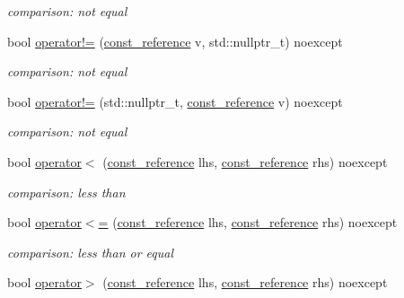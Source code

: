 \begin{DoxyCompactItemize}
\begin{DoxyCompactList}\small\item\em comparison\+: not equal \end{DoxyCompactList}\item 
bool \hyperlink{classnlohmann_1_1basic__json_ae347859ec88176ef76a0cbe5b4514fcf}{operator!=} (\hyperlink{classnlohmann_1_1basic__json_af677a29b0e66edc9f66e5167e4667071}{const\+\_\+reference} v, std\+::nullptr\+\_\+t) noexcept
\begin{DoxyCompactList}\small\item\em comparison\+: not equal \end{DoxyCompactList}\item 
bool \hyperlink{classnlohmann_1_1basic__json_a7f97a91ad8f1d5cf0b9213bd24f247c4}{operator!=} (std\+::nullptr\+\_\+t, \hyperlink{classnlohmann_1_1basic__json_af677a29b0e66edc9f66e5167e4667071}{const\+\_\+reference} v) noexcept
\begin{DoxyCompactList}\small\item\em comparison\+: not equal \end{DoxyCompactList}\item 
bool \hyperlink{classnlohmann_1_1basic__json_aacd442b66140c764c594ac8ad7dfd5b3}{operator$<$} (\hyperlink{classnlohmann_1_1basic__json_af677a29b0e66edc9f66e5167e4667071}{const\+\_\+reference} lhs, \hyperlink{classnlohmann_1_1basic__json_af677a29b0e66edc9f66e5167e4667071}{const\+\_\+reference} rhs) noexcept
\begin{DoxyCompactList}\small\item\em comparison\+: less than \end{DoxyCompactList}\item 
bool \hyperlink{classnlohmann_1_1basic__json_a5c8bb5200f5eac10d31e26be46e5b1ac}{operator$<$=} (\hyperlink{classnlohmann_1_1basic__json_af677a29b0e66edc9f66e5167e4667071}{const\+\_\+reference} lhs, \hyperlink{classnlohmann_1_1basic__json_af677a29b0e66edc9f66e5167e4667071}{const\+\_\+reference} rhs) noexcept
\begin{DoxyCompactList}\small\item\em comparison\+: less than or equal \end{DoxyCompactList}\item 
bool \hyperlink{classnlohmann_1_1basic__json_a87db51b6b936fb2ea293cdbc8702dcb8}{operator$>$} (\hyperlink{classnlohmann_1_1basic__json_af677a29b0e66edc9f66e5167e4667071}{const\+\_\+reference} lhs, \hyperlink{classnlohmann_1_1basic__json_af677a29b0e66edc9f66e5167e4667071}{const\+\_\+reference} rhs) noexcept

\end{DoxyCompactItemize}
